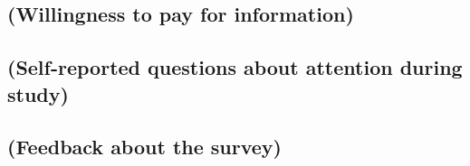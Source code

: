 \documentclass[12pt]{article}
\begin{document}
\subsection{(Willingness to pay for information)}
\subsection{(Self-reported questions about attention during study)}
\subsection{(Feedback about the survey)}
\end{document}
